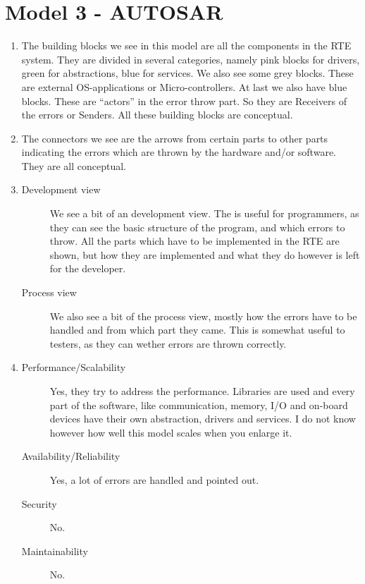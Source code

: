 \section{Model 3 - AUTOSAR}
\begin{enumerate}
	\item The building blocks we see in this model are all the components in the RTE system.
	They are divided in several categories, namely pink blocks for drivers, green for abstractions, blue for services.
	We also see some grey blocks.
	These are external OS-applications or Micro-controllers.
	At last we also have blue blocks.
	These are ``actors'' in the error throw part.
	So they are Receivers of the errors or Senders.
	All these building blocks are conceptual.
	
	\item The connectors we see are the arrows from certain parts to other parts indicating the errors which are thrown by the hardware and/or software.
	They are all conceptual.
	
	\item
    \begin{description}
        \item[Development view] We see a bit of an development view. The is useful for programmers, as they can see the basic structure of the program, and which errors to throw.
	    All the parts which have to be implemented in the RTE are shown, but how they are implemented and what they do however is left for the developer.
        \item[Process view] We also see a bit of the process view, mostly how the errors have to be handled and from which part they came. This is somewhat useful to testers, as they can wether errors are thrown correctly.
    \end{description}
	
	\item
	\begin{description}
		\item[Performance/Scalability] Yes, they try to address the performance.
		Libraries are used and every part of the software, like communication, memory, I/O and on-board devices have their own abstraction, drivers and services.
		I do not know however how well this model scales when you enlarge it.
		\item[Availability/Reliability] Yes, a lot of errors are handled and pointed out.
		\item[Security] No.
		\item[Maintainability] No.
	\end{description}
	

\end{enumerate}
